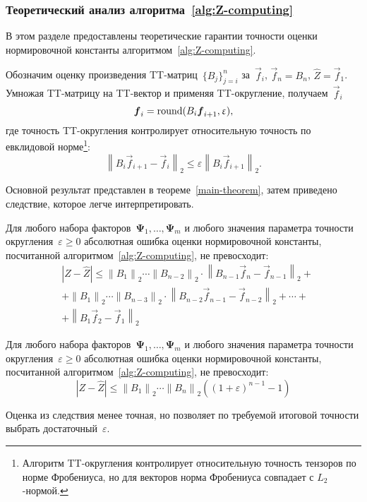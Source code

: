 \subsubsection{Теоретический анализ алгоритма~\ref{alg:Z-computing}}
В этом разделе предоставлены теоретические гарантии точности оценки нормировочной константы алгоритмом~\ref{alg:Z-computing}.

Обозначим оценку произведения TT\hyp{}матриц~$\{B_j\}_{j = i}^n$ за~$\vec{f}_i$, $\vec{f}_n = B_n$, $\widehat{Z} = \vec{f}_1$. Умножая TT\hyp{}матрицу на TT\hyp{}вектор и применяя TT\hyp{}округление, получаем~$\vec{f}_i$
$$
\boldsymbol{f}_i = \operatorname{round}(B_i \boldsymbol{f}_{i + 1}, \upvarepsilon),
$$
где точность TT\hyp{}округления контролирует относительную точность по евклидовой норме\footnote{Алгоритм TT\hyp{}округления контролирует относительную точность тензоров по норме Фробениуса, но для векторов норма Фробениуса совпадает с $L_2$-нормой.}:
\begin{equation}
\label{main-algorithm-rounding-inequality}
\left \| B_i \vec{f}_{i + 1} - \vec{f}_i \right \|_2 \leq \varepsilon \left \| B_i \vec{f}_{i + 1} \right \|_2.
\end{equation}

Основной результат представлен в теореме~\ref{main-theorem}, затем приведено следствие, которое легче интерпретировать.
\begin{theorem}
\label{main-theorem}
	Для любого набора факторов~$\mathbf{\Psi}_1, \ldots, \mathbf{\Psi}_m$ и любого значения параметра точности округления~$\varepsilon \geq 0$ абсолютная ошибка оценки нормировочной константы, посчитанной алгоритмом~\ref{alg:Z-computing}, не превосходит:
	\begin{equation}
	\begin{aligned}
	\label{tough-abs-err-bound}
	&\left |Z - \widehat{Z}  \right | \leq
	\left \| B_1 \right \|_2 \dotsm \left \| B_{n-2} \right \|_2 \cdot \left \| B_{n-1} \vec{f}_n - \vec{f}_{n-1} \right \|_2 + \\
	&+\left \| B_1 \right \|_2 \dotsm \left \| B_{n-3} \right \|_2 \cdot \left \| B_{n-2} \vec{f}_{n-1} - \vec{f}_{n-2} \right \|_2 + \dotsb + \\
	&+\left \| B_1 \vec{f}_2 - \vec{f}_1 \right \|_2
	\end{aligned}
	\end{equation}
\end{theorem}

\begin{corollary}
\label{main-theorem-corollary}
	Для любого набора факторов~$\mathbf{\Psi}_1, \ldots, \mathbf{\Psi}_m$ и любого значения параметра точности округления~$\varepsilon \geq 0$ абсолютная ошибка оценки нормировочной константы, посчитанной алгоритмом~\ref{alg:Z-computing}, не превосходит:
	\begin{equation}
		\label{epsilon-inequality}
		\left |Z - \widehat{Z}\right |  \leq \left \| B_1 \right \|_2 \dotsm \left \| B_n \right \|_2 ((1 + \varepsilon)^{n-1} - 1)
	\end{equation}
\end{corollary}
Оценка из следствия менее точная, но позволяет по требуемой итоговой точности выбрать достаточный~$\varepsilon$.

